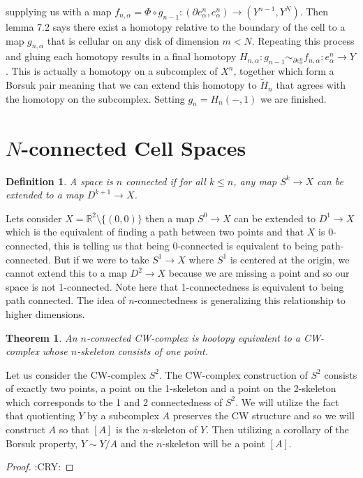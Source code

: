 \documentclass[40pt]{article}
\newtheorem{definition}{Definition}[section]
\newtheorem{theorem}{Theorem}[section]
\newcommand{\R}{\mathbb{R}}
\begin{document}
		supplying us with a map $f_{n,\alpha} = \Phi \circ g_{n-1} : (\partial e_\alpha^n, e_\alpha^n) \rightarrow (Y^{n-1}, Y^N)$. Then lemma 7.2 says there exist a homotopy relative to the boundary of the cell to a map $g_{n,\alpha}$ that is cellular on any disk of dimension $m < N$. Repeating this process and gluing each homotopy results in a final homotopy $H_{n,\alpha} : g_{n-1} \sim_{\partial e_\alpha^n} f_{n,\alpha} : e_\alpha^n \rightarrow Y$. This is actually a homotopy on a subcomplex of $X^n$, together which form a Borsuk pair meaning that we can extend this homotopy to $\tilde{H}_{n}$ that agrees with the homotopy on the subcomplex. Setting $g_n = H_n(-,1)$ we are finished. 
		\section{$N$-connected Cell Spaces} 
		\begin{definition}
			A space is $n$ connected if for all $k \leq n$, any map $S^k \rightarrow X$ can be extended to a map $D^{k+1} \rightarrow X$. 
		\end{definition}
		Lets consider $X = \R^2 \setminus \{(0,0)\}$ then a map $S^0 \rightarrow X$ can be extended to $D^1 \rightarrow X$ which is the equivalent of finding a path between two points and that $X$ is 0-connected, this is telling us that being 0-connected is equivalent to being path-connected. But if we were to take $S^1 \rightarrow X$ where $S^1$ is centered at the origin, we cannot extend this to a map $D^2 \rightarrow X$ because we are missing a point and so our space is not 1-connected. Note here that 1-connectedness is equivalent to being path connected. The idea of $n$-connectedness is generalizing this relationship to higher dimensions. 
		\begin{theorem}
			An $n$-connected CW-complex is hootopy equivalent to a CW-complex whose $n$-skeleton consists of one point. 
		\end{theorem}
		Let us consider the CW-complex $S^2$. The CW-complex construction of $S^2$ consists of exactly two points, a point on the 1-skeleton and a point on the 2-skeleton which corresponds to the 1 and 2 connectedness of $S^2$. We will utilize the fact that quotienting $Y$ by a subcomplex $A$ preserves the CW structure and so we will construct $A$ so that $[A]$ is the $n$-skeleton of $Y$. Then utilizing a corollary of the Borsuk property, $Y \sim Y/A$ and the $n$-skeleton will be a point $[A]$.
		\begin{proof}
			:CRY:
		\end{proof}
		
\end{document}
